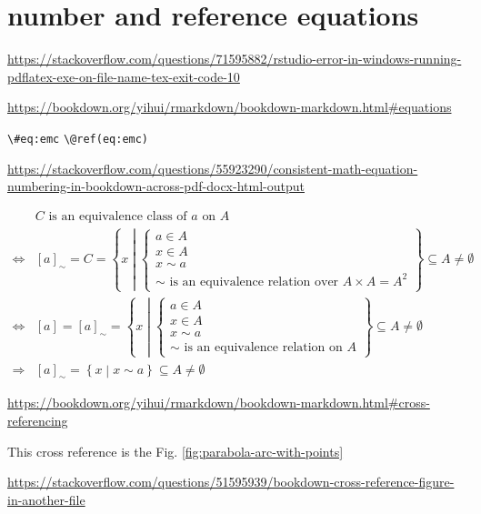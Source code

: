 \documentclass[
]{book}
\theoremstyle{definition}
\theoremstyle{definition}
\theoremstyle{definition}
\theoremstyle{definition}
\theoremstyle{remark}
\begin{document}
\hypertarget{number-and-reference-equations}{%
\section{number and reference equations}\label{number-and-reference-equations}}

\url{https://stackoverflow.com/questions/71595882/rstudio-error-in-windows-running-pdflatex-exe-on-file-name-tex-exit-code-10}

\url{https://bookdown.org/yihui/rmarkdown/bookdown-markdown.html\#equations}

\texttt{\textbackslash{}\#eq:emc}
\texttt{\textbackslash{}@ref(eq:emc)}

\url{https://stackoverflow.com/questions/55923290/consistent-math-equation-numbering-in-bookdown-across-pdf-docx-html-output}

\begin{equation}
\begin{aligned}
 & C\text{ is an equivalence class of }a\text{ on }A\\
\Leftrightarrow & \left[a\right]_{\sim}=C=\left\{ x\middle|\begin{cases}
a\in A\\
x\in A\\
x\sim a\\
\sim\text{ is an equivalence relation over }A\times A=A^{2}
\end{cases}\right\} \subseteq A\ne\emptyset\\
\Leftrightarrow & \left[a\right]=\left[a\right]_{\sim}=\left\{ x\middle|\begin{cases}
a\in A\\
x\in A\\
x\sim a\\
\sim\text{ is an equivalence relation on }A
\end{cases}\right\} \subseteq A\ne\emptyset\\
\Rightarrow & \left[a\right]_{\sim}=\left\{ x\middle|x\sim a\right\} \subseteq A\ne\emptyset
\end{aligned}
\label{eq:eqclass}
\end{equation}

\url{https://bookdown.org/yihui/rmarkdown/bookdown-markdown.html\#cross-referencing}

This cross reference is the Fig. \ref{fig:parabola-arc-with-points}

\url{https://stackoverflow.com/questions/51595939/bookdown-cross-reference-figure-in-another-file}
\end{document}
